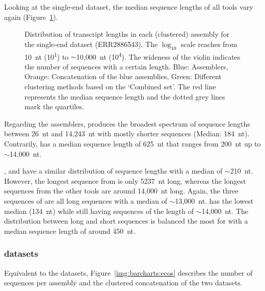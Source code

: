 \documentclass[12pt,a4paper,english]{article}
\begin{document}
    Looking at the single-end dataset, the median sequence lengths of all tools vary again (Figure~\ref{img:violin:cel_ERR2886543}).
    \begin{figure}[H]
    	\centering
    	\def\svgwidth{\textwidth}
    	
    	\caption[Distribution of transcript lengths per assembly (PE, ERR2886543)]{Distribution of transcript lengths in each (clustered) assembly for the single-end \celegans dataset (ERR2886543). The $\log_{10}$ scale reaches from 10~nt (10\textsuperscript{1}) to $\sim$10,000~nt (10\textsuperscript{4}). The wideness of the violin indicates the number of sequences with a certain length. Blue: Assemblers, Orange: Concatenation of the blue assemblies, Green: Different clustering methods based on the `Combined set'. The red line represents the median sequence length and the dotted grey lines mark the quartiles.}
    	\label{img:violin:cel_ERR2886543}
    \end{figure}
	Regarding the assemblers, \soap produces the broadest spectrum of sequence lengths between 26~nt and 14,243~nt with mostly shorter sequences (Median: 184~nt). Contrarily, \trinity has a median sequence length of 625~nt that ranges from 200~nt up to $\sim$14,000~nt.
	
	\cdhit, \linclust and \mclust have a similar distribution of sequence lengths with a median of $\sim$210~nt. However, the longest sequence from \mclust is only 5237~nt long, whereas the longest sequences from the other tools are around 14,000~nt long.
	Again, the three sequences of \grouper are all long sequences with a median of $\sim$13,000~nt.
	\mclusttwo has the lowest median (134~nt) while still having sequences of the length of $\sim$14,000~nt.
	The distribution between long and short sequences is balanced the most for \karma with a median sequence length of around 450~nt.



\subsubsection*{\ecoli datasets}

    Equivalent to the \celegans datasets, Figure~\ref{img:barcharts:ecos} describes the number of sequences per assembly and the clustered concatenation of the two \ecoli datasets.
\end{document}
